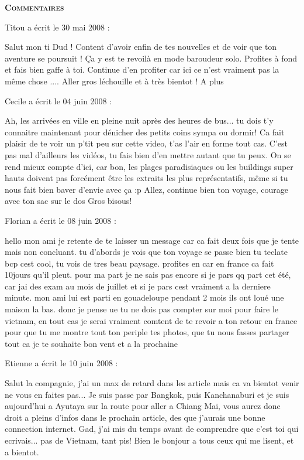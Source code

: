 \bigskip
\textbf{\textsc{Commentaires}}

\medskip
Titou a écrit le 30 mai 2008 :
\begin{displayquote}
Salut mon ti Dud !
Content d'avoir enfin de tes nouvelles et de voir que ton aventure se poursuit ! Ça y est te revoilà en mode baroudeur solo. Profites à fond et fais bien gaffe à toi.
Continue d'en profiter car ici ce n'est vraiment pas la même chose ....
Aller gros léchouille et à très bientot !
A plus
\end{displayquote}

\medskip
Cecile a écrit le 04 juin 2008 :
\begin{displayquote}
Ah, les arrivées en ville en pleine nuit après des heures de bus... tu dois t'y connaitre maintenant pour dénicher des petits coins sympa ou dormir!
Ca fait plaisir de te voir un p'tit peu sur cette video, t'as l'air en forme tout cas. C'est pas mal d'ailleurs les vidéos, tu fais bien d'en mettre autant que tu peux. On se rend mieux compte d'ici, car bon, les plages paradisiaques ou les buildings super hauts doivent pas forcément être les extraits les plus représentatifs, même si tu nous fait bien baver d'envie avec ça :p
Allez, continue bien ton voyage, courage avec ton sac sur le dos
Gros bisous!
\end{displayquote}

\medskip
Florian a écrit le 08 juin 2008 :
\begin{displayquote}
hello mon ami
je retente de te laisser un message car ca fait deux fois que je tente mais non concluant. tu d'abords je vois que ton voyage se passe bien tu teclate bcp cest cool, tu vois de tres beau paysage. profites en car en france ca fait 10jours qu'il pleut.
pour ma part je ne sais pas encore si je pars qq part cet été, car jai des exam au mois de juillet et si je pars cest vraiment a la derniere minute.
mon ami lui est parti en gouadeloupe pendant 2 mois ils ont loué une maison la bas.
donc je pense ue tu ne dois pas compter sur moi pour faire le vietnam, en tout cas je serai vraiment comtent de te revoir a ton retour en france pour que tu me montre tout ton periple tes photos, que tu nous fasses partager tout ca
je te souhaite bon vent et a la prochaine
\end{displayquote}

\medskip
Etienne a écrit le 10 juin 2008 :
\begin{displayquote}
Salut la compagnie, j'ai un max de retard dans les article mais ca va bientot venir ne vous en faites pas...
Je suis passe par Bangkok, puis Kanchanaburi et je suis aujourd'hui a Ayutaya sur la route pour aller a Chiang Mai, vous aurez donc droit a pleins d'infos dans le prochain article, des que j'aurais une bonne connection internet.
Gad, j'ai mis du temps avant de comprendre que c'est toi qui ecrivais... pas de Vietnam, tant pis!
Bien le bonjour a tous ceux qui me lisent, et a bientot.
\end{displayquote}

